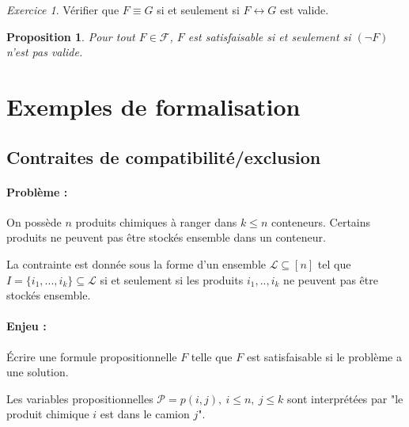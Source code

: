 \documentclass[]{article}
\newtheorem{myproposition}{Proposition}
\theoremstyle{remark}
\newtheorem{myexer}{Exercice}
\theoremstyle{definition}
\begin{document}
\begin{myexer}
	Vérifier que $F \equiv G$ si et seulement si $F \leftrightarrow G$ est valide.
\end{myexer}

\begin{myproposition}
	Pour tout $F \in \mathcal{F}$, $F$ est satisfaisable si et seulement si $(\neg F)$ n'est pas valide.
\end{myproposition}

\section{Exemples de formalisation}

\subsection{Contraites de compatibilité/exclusion}

\paragraph{Problème :}On possède $n$ produits chimiques à ranger dans $k \leqslant n$ conteneurs. Certains produits ne peuvent pas être stockés ensemble dans un conteneur.

La contrainte est donnée sous la forme d'un ensemble $\mathcal{L} \subseteq [n]$ tel que $I = \{i_1, ..., i_k\} \subseteq \mathcal{L}$ si et seulement si les produits $i_1, .., i_k$ ne peuvent pas être stockés ensemble.

\paragraph{Enjeu :}
Écrire une formule propositionnelle $F$ telle que $F$ est satisfaisable si le problème a une solution.

Les variables propositionnelles $\mathcal{P}=p(i, j), ~ i \leqslant n, ~ j \leqslant k$ sont interprétées par "le produit chimique $i$ est dans le camion $j$".
\end{document}
